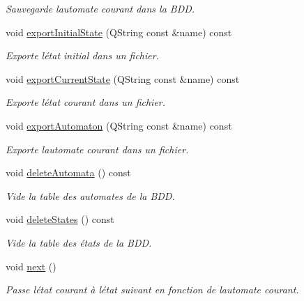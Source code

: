 \begin{DoxyCompactItemize}
\begin{DoxyCompactList}\small\item\em Sauvegarde l\textquotesingle{}automate courant dans la B\+DD. \end{DoxyCompactList}\item 
void \mbox{\hyperlink{class_automata_manager_a85d9f8b8d615af7dfdcef1c951891fb4}{export\+Initial\+State}} (Q\+String const \&name) const
\begin{DoxyCompactList}\small\item\em Exporte l\textquotesingle{}état initial dans un fichier. \end{DoxyCompactList}\item 
void \mbox{\hyperlink{class_automata_manager_a1447d0194ceb94e4fc817aced4a5a24d}{export\+Current\+State}} (Q\+String const \&name) const
\begin{DoxyCompactList}\small\item\em Exporte l\textquotesingle{}état courant dans un fichier. \end{DoxyCompactList}\item 
void \mbox{\hyperlink{class_automata_manager_a32fe2c68595c78f6c4f0f04b3ba73061}{export\+Automaton}} (Q\+String const \&name) const
\begin{DoxyCompactList}\small\item\em Exporte l\textquotesingle{}automate courant dans un fichier. \end{DoxyCompactList}\item 
void \mbox{\hyperlink{class_automata_manager_ac8ef4e6c83beca1b281b6e3f5a025196}{delete\+Automata}} () const
\begin{DoxyCompactList}\small\item\em Vide la table des automates de la B\+DD. \end{DoxyCompactList}\item 
void \mbox{\hyperlink{class_automata_manager_a0066613740ed43d595ad32d6d4d75282}{delete\+States}} () const
\begin{DoxyCompactList}\small\item\em Vide la table des états de la B\+DD. \end{DoxyCompactList}\item 
void \mbox{\hyperlink{class_automata_manager_ae7788f4fb5ae9c6f4ffaf6b471d969ad}{next}} ()
\begin{DoxyCompactList}\small\item\em Passe l\textquotesingle{}état courant à l\textquotesingle{}état suivant en fonction de l\textquotesingle{}automate courant. \end{DoxyCompactList}\item 

\end{DoxyCompactItemize}
